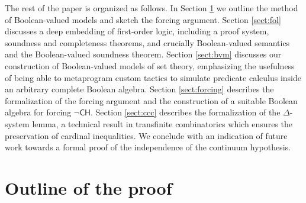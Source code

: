 \documentclass[a4paper,USenglish,cleveref, autoref]{lipics-v2019}
\begin{document}
The rest of the paper is organized as follows. In Section \ref{sect:outline} we outline the method of Boolean-valued models and sketch the forcing argument. Section \ref{sect:fol} discusses a deep embedding of first-order logic, including a proof system, soundness and completeness theorems, and crucially Boolean-valued semantics and the Boolean-valued soundness theorem. Section \ref{sect:bvm} discusses our construction of Boolean-valued models of set theory, emphasizing the usefulness of being able to metaprogram custom tactics to simulate predicate calculus inside an arbitrary complete Boolean algebra. Section \ref{sect:forcing} describes the formalization of the forcing argument and the construction of a suitable Boolean algebra for forcing $\neg\mathsf{CH}$. Section \ref{sect:ccc} describes the formalization of the $\Delta$-system lemma, a technical result in transfinite combinatorics which ensures the preservation of cardinal inequalities. We conclude with an indication of future work towards a formal proof of the independence of the continuum hypothesis.
\section{Outline of the proof}
\label{sect:outline}




\end{document}

